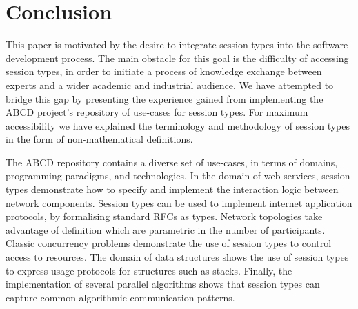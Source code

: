 
\section{Conclusion}
\label{sec:conclusion}

This paper is motivated by the desire
to integrate session types into the software
development process. The main obstacle for this goal is the difficulty of accessing
session types, in order to initiate a process
of knowledge exchange between 
experts and a wider academic and industrial
audience. We have attempted to bridge this gap by presenting the experience gained from implementing
the ABCD project's repository of use-cases for session types. For maximum accessibility we have explained the terminology and methodology of session types in the form of non-mathematical
definitions.



The ABCD repository contains a 
diverse set of use-cases, in terms of domains,
programming paradigms, and technologies.
In the domain of web-services, session types
demonstrate how to specify and implement
the interaction logic between network components.
Session types can be used to implement internet
application protocols, by formalising standard RFCs as types. Network topologies
take advantage of definition which are parametric in the number
of participants. Classic concurrency problems demonstrate
the use of session types to control access to resources. The domain
of data structures shows the use of session types to express usage protocols for structures such as stacks. Finally, the implementation of several parallel algorithms shows that session types can capture common algorithmic communication patterns. 




